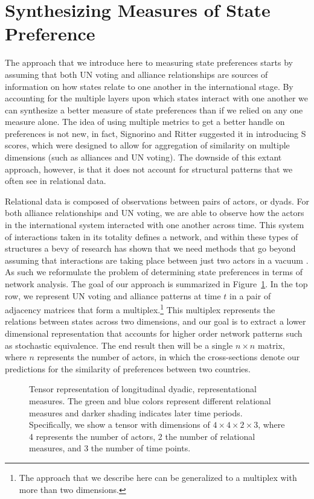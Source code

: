 \section*{Synthesizing Measures of State Preference}

The approach that we introduce here to measuring state preferences starts by assuming that both UN voting and alliance relationships are sources of information on how states relate to one another in the international stage. By accounting for the multiple layers upon which states interact with one another we can synthesize a better measure of state preferences than if we relied on any one measure alone. The idea of using multiple metrics to get a better handle on preferences is not new, in fact, Signorino and Ritter suggested it in introducing S scores, which were designed to allow for aggregation of similarity on multiple dimensions (such as alliances and UN voting). The downside of this extant approach, however, is that it does not account for structural patterns that we often see in relational data. 

Relational data is composed of observations between pairs of actors, or dyads. For both alliance relationships and UN voting, we are able to observe how the actors in the international system  interacted with one another across time. This system of interactions taken in its totality defines a network, and within these types of structures a bevy of research has shown that we need methods that go beyond assuming that interactions are taking place between just two actors in a vacuum \citep{wasserman:faust:1994,snijders:nowicki:1997}. As such we reformulate the problem of determining state preferences in terms of network analysis. The goal of our approach is summarized in Figure~\ref{fig:tensViz}. In the top row, we represent UN voting and alliance patterns at time $t$ in a pair of adjacency matrices that form a multiplex.\footnote{The approach that we describe here can be generalized to a multiplex with more than two dimensions.} This multiplex represents the relations between states across two dimensions, and our goal is to extract a lower dimensional representation that accounts for higher order network patterns such as stochastic equivalence. The end result then will be a single $n \times n$ matrix, where $n$ represents the number of actors, in which the cross-sections denote our predictions for the similarity of preferences between two countries.

\begin{figure}[ht]
	\centering
	\resizebox{.5\textwidth}{!}{}
	\caption{Tensor representation of longitudinal dyadic, representational measures. The green and blue colors represent different relational measures and darker shading indicates later time periods. Specifically, we show a tensor with dimensions of $4 \times 4 \times 2 \times 3$, where 4 represents the number of actors, 2 the number of relational measures, and 3 the number of time points.}
	\label{fig:tensViz}
\end{figure}

